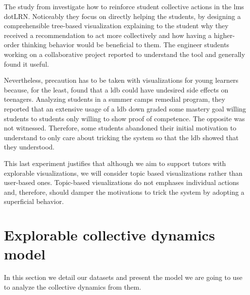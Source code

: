 \documentclass[a4paper,twoside]{article}
\begin{document}
The study from \cite{Anaya2016} investigate how to reinforce student collective actions in the \gls{lms} dotLRN.  Noticeably they focus on directly helping the students, by designing a comprehensible tree-based visualization explaining to the student why they received a recommendation to act more collectively and how having a higher-order thinking behavior would be beneficial to them.
The engineer students working on a collaborative project reported to understand the tool and generally found it useful.

Nevertheless, precaution has to be taken with visualizations for young learners because, for the least, \cite{Lonn2015} found that a \gls{ldb} could have undesired side effects on teenagers.  Analyzing students in a summer camps remedial program, they reported that an extensive usage of a \gls{ldb} down graded some mastery goal willing students to students only willing to show proof of competence.  The opposite was not witnessed.  Therefore, some students abandoned their initial motivation to understand to only care about tricking the system so that the \gls{ldb} showed that they understood.

This last experiment justifies that although we aim to support tutors with explorable visualizations, we will consider topic based visualizations rather than user-based ones.  Topic-based visualizations do not emphases individual actions and, therefore, should damper the motivations to trick the system by adopting a superficial behavior.


\section{Explorable collective dynamics model}
\label{section:4}
In this section we detail our datasets and present the model we are going to use to analyze the collective dynamics from them.
\end{document}

